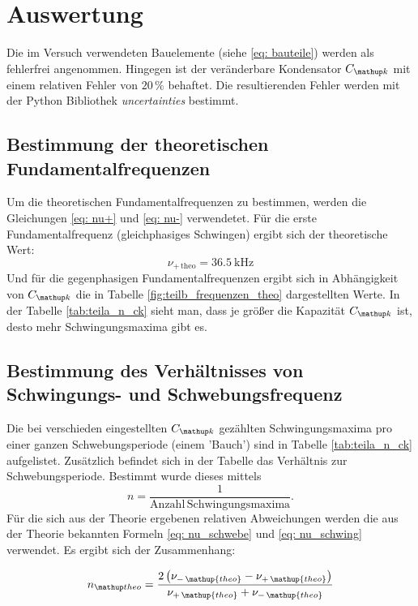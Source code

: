 \section{Auswertung}
Die im Versuch verwendeten Bauelemente (siehe \eqref{eq: bauteile})
werden als fehlerfrei angenommen.
Hingegen ist der veränderbare Kondensator $C\ua{k}$ mit
einem relativen Fehler von $20\,\%$ behaftet.
Die resultierenden Fehler werden mit der Python Bibliothek
\emph{uncertainties} bestimmt.

\subsection{Bestimmung der theoretischen Fundamentalfrequenzen}
Um die theoretischen Fundamentalfrequenzen zu bestimmen, werden die Gleichungen \eqref{eq: nu+} und
\eqref{eq: nu-} verwendetet.
Für die erste Fundamentalfrequenz (gleichphasiges Schwingen) ergibt sich der
theoretische Wert: %
\begin{equation}
\label{eq:nu_plu_theo}
\nu_{+\,\mathup{theo}}=\SI{36,5}{\kilo\hertz}
\end{equation}
Und für die gegenphasigen Fundamentalfrequenzen ergibt sich in Abhängigkeit von $C\ua{k}$ die in Tabelle \ref{fig:teilb_frequenzen_theo}  dargestellten Werte. %
In der Tabelle \ref{tab:teila_n_ck} sieht man, dass je größer die Kapazität $C\ua{k}$ ist, desto
mehr Schwingungsmaxima gibt es.


\subsection{Bestimmung des Verhältnisses von Schwingungs- und Schwebungsfrequenz}
Die bei verschieden eingestellten $C\ua{k}$ gezählten Schwingungsmaxima pro einer ganzen %
Schwebungsperiode (einem 'Bauch') sind in Tabelle \ref{tab:teila_n_ck} aufgelistet. %
Zusätzlich befindet sich in der Tabelle das Verhältnis zur Schwebungsperiode. %
Bestimmt wurde dieses mittels %
\begin{equation*}
n=\frac{1}{\mathup{Anzahl \, Schwingungsmaxima}}.
\end{equation*}
Für die sich aus der Theorie ergebenen relativen Abweichungen werden die aus der Theorie
bekannten Formeln \eqref{eq: nu_schwebe} und \eqref{eq: nu_schwing} verwendet.
Es ergibt sich der Zusammenhang:

\begin{equation*}
n\ua{theo}=\frac{2\left(\nu_{-\,\mathup{theo}}-\nu_{+\,\mathup{theo}}\right)}{\nu_{+\,\mathup{theo}}+\nu_{-\,\mathup{theo}}}
\end{equation*}


